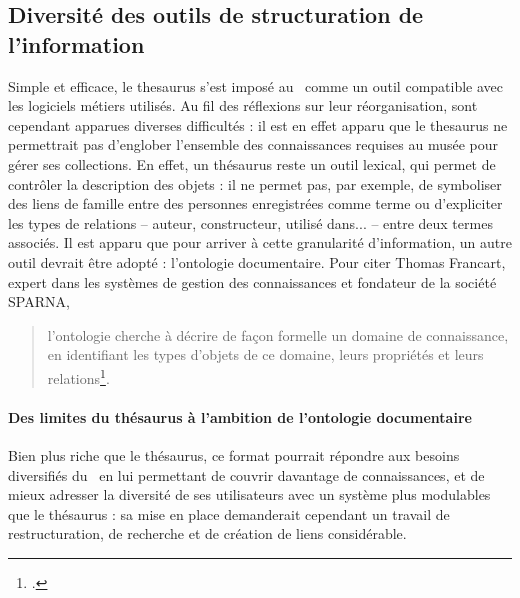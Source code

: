 \subsection{Diversité des outils de structuration de l’information}


Simple et efficace, le \gls{thesaurus} s'est imposé au \mae~comme un outil compatible avec les logiciels métiers utilisés. Au fil des réflexions sur leur réorganisation, sont cependant apparues diverses difficultés : il est en effet apparu que le \gls{thesaurus} ne permettrait pas d'englober l'ensemble des connaissances requises au musée pour gérer ses collections. En effet, un thésaurus reste un outil lexical, qui permet de contrôler la description des objets : il ne permet pas, par exemple, de symboliser des liens de famille entre des personnes enregistrées comme terme ou d'expliciter les types de relations -- auteur, constructeur, utilisé dans... -- entre deux termes associés.
Il est apparu que pour arriver à cette granularité d'information, un autre outil devrait être adopté : l'ontologie documentaire. Pour citer Thomas Francart, expert dans les systèmes de gestion des connaissances et fondateur de la société SPARNA, \blockquote{l’ontologie cherche à décrire de façon formelle un domaine de connaissance, en identifiant les types d’objets de ce domaine, leurs propriétés et leurs relations\footcite{francartOntologieThesaurusTaxonomie2013}.}

\paragraph*{Des limites du thésaurus à l’ambition de l’ontologie documentaire}

Bien plus riche que le thésaurus, ce format pourrait répondre aux besoins diversifiés du \mae~en lui permettant de couvrir davantage de connaissances, et de mieux adresser la diversité de ses utilisateurs avec un système plus modulables que le thésaurus : sa mise en place demanderait cependant un travail de restructuration, de recherche et de création de liens considérable.

